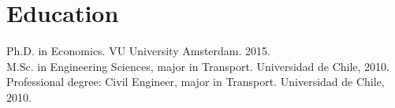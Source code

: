 \documentclass[10pt,a4paper]{article}
\newif\ifES
\newcommand{\tr}[2]{\ifES#2\else#1\fi}
\begin{document}

\section*{\tr{Education}{Formaci\'{o}n acad\'{e}mica}}

\tr{Ph.D. in Economics. VU University Amsterdam. 2015.}{Ph.D. en Econom\'{i}a. VU University Amsterdam. 2015.} \\[4pt]
\tr{M.Sc. in Engineering Sciences, major in Transport. Universidad de Chile, 2010.}{Mag\'{i}ster en Ciencias de la Ingenier\'{i}a, menci\'{o}n Transporte. Universidad de Chile, 2010.} \\[4pt]
\tr{Professional degree: Civil Engineer, major in Transport. Universidad de Chile, 2010.}{T\'{i}tulo de Ingeniero Civil, menci\'{o}n Transporte. Universidad de Chile, 2010.}

\end{document}
